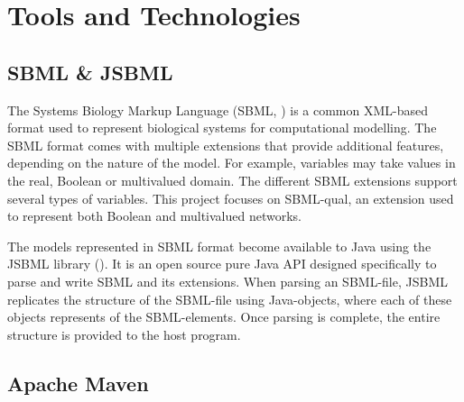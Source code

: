 \chapter{Tools and Technologies}

\section{SBML \& JSBML}

    
The Systems Biology Markup Language (SBML, \cite{hucka2018systems}) is a common XML-based format used to represent biological systems for computational modelling. The SBML format comes with multiple extensions that provide additional features, depending on the nature of the model. For example, variables may take values in the real, Boolean or multivalued domain. The different SBML extensions support several types of variables. This project focuses on SBML-qual, an extension used to represent both Boolean and multivalued networks.

The models represented in SBML format become available to Java using the JSBML library (\cite{sbmlteam_2020}). It is an open source pure Java API designed specifically to parse and write SBML and its extensions. When parsing an SBML-file, JSBML replicates the structure of the SBML-file using Java-objects, where each of these objects represents of the SBML-elements. Once parsing is complete, the entire structure is provided to the host program.

    

\section{Apache Maven}
    

